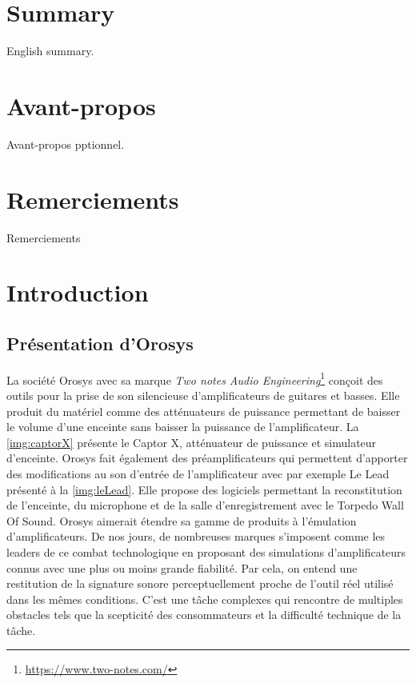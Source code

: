 \documentclass[a4paper]{article}
\begin{document}
\newpage
\section*{Summary}

English summary.

\newpage
\section*{Avant-propos}

Avant-propos pptionnel.

\newpage
\section*{Remerciements}

Remerciements

\newpage
\begingroup
{}
\thispagestyle{empty}
\tableofcontents
\thispagestyle{empty}
\endgroup

\newpage
\section{Introduction}
\subsection{Présentation d'Orosys}

La société Orosys avec sa marque \textit{Two notes Audio Engineering}\footnote{\url{https://www.two-notes.com/}} conçoit des outils pour la prise de son silencieuse d’amplificateurs de guitares et basses.
Elle produit du matériel comme des atténuateurs de puissance permettant de baisser le volume d'une enceinte sans baisser la puissance de l'amplificateur.
La \autoref{img:captorX} présente le Captor X, atténuateur de puissance et simulateur d'enceinte.
Orosys fait également des préamplificateurs qui permettent d'apporter des modifications au son d'entrée de l'amplificateur avec par exemple Le Lead présenté à la \autoref{img:leLead}.
Elle propose des logiciels permettant la reconstitution de l’enceinte, du microphone et de la salle d’enregistrement avec le Torpedo Wall Of Sound.
Orosys aimerait étendre sa gamme de produits à l’émulation d’amplificateurs.
De nos jours, de nombreuses marques s’imposent comme les leaders de ce combat technologique en proposant des simulations d'amplificateurs connus avec une plus ou moins grande fiabilité.
Par cela, on entend une restitution de la signature sonore perceptuellement proche de l’outil réel utilisé dans les mêmes conditions.
C’est une tâche complexes qui rencontre de multiples obstacles tels que la scepticité des consommateurs et la difficulté technique de la tâche.
\end{document}
